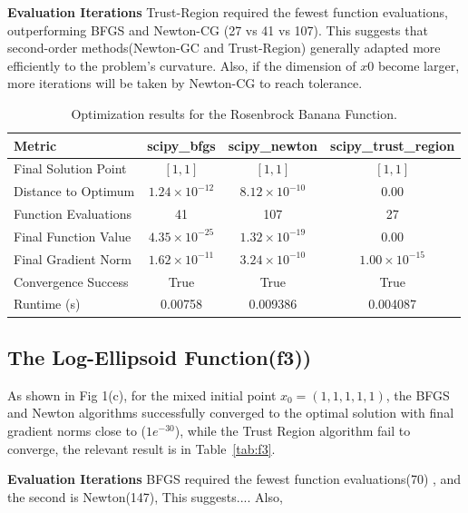 \documentclass[12pt]{article}
\begin{document}
\textbf{Evaluation Iterations}  
Trust-Region required the fewest function evaluations, outperforming BFGS and Newton-CG (27 vs 41 vs 107). This suggests that second-order methods(Newton-GC and Trust-Region) generally adapted more efficiently to the problem’s curvature. Also, if the dimension of $x0$ become larger, more iterations will be taken by Newton-CG to reach tolerance.


\begin{table}[h]
    \centering
\begin{tabular}{lccc}
    \toprule
    Metric & scipy\_bfgs & scipy\_newton & scipy\_trust\_region \\
    \midrule
    Final Solution Point & $[1, 1]$ & $[1, 1]$ & $[1, 1]$ \\
    Distance to Optimum & $1.24\times10^{-12}$ & $8.12\times10^{-10}$ & $0.00$ \\
    Function Evaluations & 41 & 107 & 27 \\
    Final Function Value & $4.35\times10^{-25}$ & $1.32\times10^{-19}$ & $0.00$ \\
    Final Gradient Norm & $1.62\times10^{-11}$ & $3.24\times10^{-10}$ & $1.00\times10^{-15}$ \\
    Convergence Success & True & True & True \\
    Runtime (s) & 0.00758 & 0.009386 & 0.004087 \\
    \bottomrule
\end{tabular}
    \caption{Optimization results for the Rosenbrock Banana Function.}
    \label{tab:f2}
\end{table}


\subsection{The Log-Ellipsoid Function(f3))}
As shown in Fig 1(c),  for the mixed initial point $x_0 = (1, 1,1 ,1, 1)$, the BFGS and Newton algorithms successfully  converged to the optimal solution with final gradient norms close to ($1e^{-30}$), while the Trust Region algorithm fail to converge, the relevant result is in Table~\ref{tab:f3}.

\textbf{Evaluation Iterations}  BFGS required the fewest function evaluations(70) , and the second is Newton(147),  This suggests....
Also, 
\end{document}
